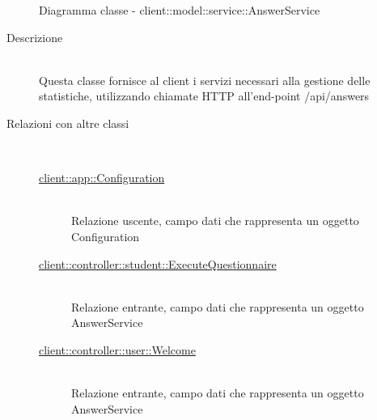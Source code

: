 \begin{description}
\begin{itemize}
\end{itemize}

\end{description}

\vspace{0.5cm}
\hypertarget{client::model::service::AnswerService}{}
\begin{figure}[H]
	\centering
	\caption{Diagramma classe - client::model::service::AnswerService}
\end{figure}\begin{description}
\item[Descrizione] \hfill \\
Questa classe fornisce al client i servizi necessari alla gestione delle statistiche, utilizzando chiamate HTTP all'end-point /api/answers
\item[Relazioni con altre classi] \hfill \\
\vspace{-7mm}
\begin{description}
	\item[\hyperlink{client::app::Configuration}{client::app::Configuration}] \hfill \\
	Relazione uscente, campo dati che rappresenta un oggetto Configuration
	\item[\hyperlink{client::controller::student::ExecuteQuestionnaire}{client::controller::student::ExecuteQuestionnaire}] \hfill \\
	Relazione entrante, campo dati che rappresenta un oggetto AnswerService	
	\item[\hyperlink{client::controller::user::Welcome}{client::controller::user::Welcome}] \hfill \\
	Relazione entrante, campo dati che rappresenta un oggetto AnswerService
\end{description}


\end{description}
